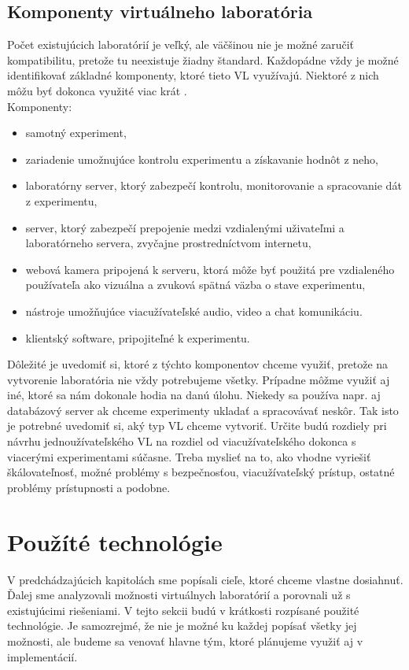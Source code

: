 \subsection{Komponenty virtuálneho laboratória}
Počet existujúcich laboratórií je veľký, ale väčšinou nie je možné zaručiť kompatibilitu, pretože tu neexistuje žiadny štandard. Každopádne vždy je možné identifikovať základné komponenty, ktoré tieto VL využívajú. Niektoré z nich môžu byť dokonca využité viac krát \cite{article-components-vl}.\\

\noindent Komponenty:
\begin{itemize}
  \item samotný experiment,
  \item zariadenie umožnujúce kontrolu experimentu a získavanie hodnôt z neho,
  \item laboratórny server, ktorý zabezpečí kontrolu, monitorovanie a spracovanie dát z experimentu,
  \item server, ktorý zabezpečí prepojenie medzi vzdialenými uživateľmi a laboratórneho servera, zvyčajne prostredníctvom internetu,
  \item webová kamera pripojená k serveru, ktorá môže byť použitá pre vzdialeného používateľa ako vizuálna a zvuková spätná väzba o stave experimentu,
  \item nástroje umožňujúce viacužívateľské audio, video a chat komunikáciu.
  \item klientský software, pripojiteľné k experimentu.\\
\end{itemize}

Dôležité je uvedomiť si, ktoré z týchto komponentov chceme využiť, pretože na vytvorenie laboratória nie vždy potrebujeme všetky. Prípadne môžme využiť aj iné, ktoré sa nám dokonale hodia na danú úlohu. Niekedy sa používa napr. aj databázový server ak chceme experimenty ukladať a spracovávať neskôr. Tak isto je potrebné uvedomiť si, aký typ VL chceme vytvoriť. Určite budú rozdiely pri návrhu jednoužívateľského VL na rozdiel od viacužívateľského dokonca s viacerými experimentami súčasne. Treba myslieť na to, ako vhodne vyriešiť škálovateľnosť, možné problémy s bezpečnosťou, viacužívateľský prístup, ostatné problémy prístupnosti a podobne.


\section{Použíté technológie}\label{used-technologies}
V predchádzajúcich kapitolách sme popísali cieľe, ktoré chceme vlastne dosiahnuť. Ďalej sme analyzovali možnosti virtuálnych laboratórií a porovnali už s existujúcimi riešeniami. V tejto sekcii budú v krátkosti rozpísané použité technológie. Je samozrejmé, že nie je možné ku každej popísať všetky jej možnosti, ale budeme sa venovať hlavne tým, ktoré plánujeme využiť aj v implementácií.

